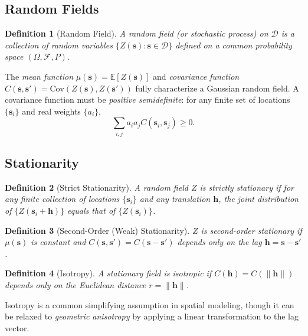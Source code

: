 \documentclass[conference]{IEEEtran}
\newtheorem{definition}{Definition}
\begin{document}
\subsection{Random Fields}

\begin{definition}[Random Field]
A \emph{random field} (or \emph{stochastic process}) on $\mathcal{D}$ is a collection of random variables $\{Z(\mathbf{s}) : \mathbf{s} \in \mathcal{D}\}$ defined on a common probability space $(\Omega, \mathcal{F}, P)$.
\end{definition}

The \emph{mean function} $\mu(\mathbf{s}) = \mathbb{E}[Z(\mathbf{s})]$ and \emph{covariance function} $C(\mathbf{s}, \mathbf{s}') = \text{Cov}(Z(\mathbf{s}), Z(\mathbf{s}'))$ fully characterize a Gaussian random field. A covariance function must be \emph{positive semidefinite}: for any finite set of locations $\{\mathbf{s}_i\}$ and real weights $\{a_i\}$,
\begin{equation}
  \sum_{i,j} a_i a_j C(\mathbf{s}_i, \mathbf{s}_j) \geq 0.
  \label{eq:psd}
\end{equation}

\subsection{Stationarity}

\begin{definition}[Strict Stationarity]
A random field $Z$ is \emph{strictly stationary} if for any finite collection of locations $\{\mathbf{s}_i\}$ and any translation $\mathbf{h}$, the joint distribution of $\{Z(\mathbf{s}_i + \mathbf{h})\}$ equals that of $\{Z(\mathbf{s}_i)\}$.
\end{definition}

\begin{definition}[Second-Order (Weak) Stationarity]
$Z$ is \emph{second-order stationary} if $\mu(\mathbf{s})$ is constant and $C(\mathbf{s}, \mathbf{s}') = C(\mathbf{s} - \mathbf{s}')$ depends only on the lag $\mathbf{h} = \mathbf{s} - \mathbf{s}'$.
\end{definition}

\begin{definition}[Isotropy]
A stationary field is \emph{isotropic} if $C(\mathbf{h}) = C(\|\mathbf{h}\|)$ depends only on the Euclidean distance $r = \|\mathbf{h}\|$.
\end{definition}

Isotropy is a common simplifying assumption in spatial modeling, though it can be relaxed to \emph{geometric anisotropy} by applying a linear transformation to the lag vector.
\end{document}
